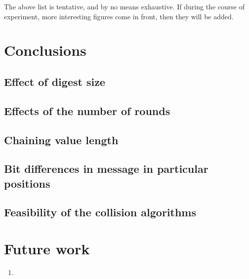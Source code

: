 The above list is tentative, and by no means exhaustive. If during the course of experiment, more 
interesting figures come in front, then they will be added.

\section{Conclusions}

\subsection{Effect of digest size}

\subsection{Effects of the number of rounds}

\subsection{Chaining value length}

\subsection{Bit differences in message in particular positions}

\subsection{Feasibility of the collision algorithms}

\section{Future work}

\begin{enumerate}
\item
\end{enumerate}
